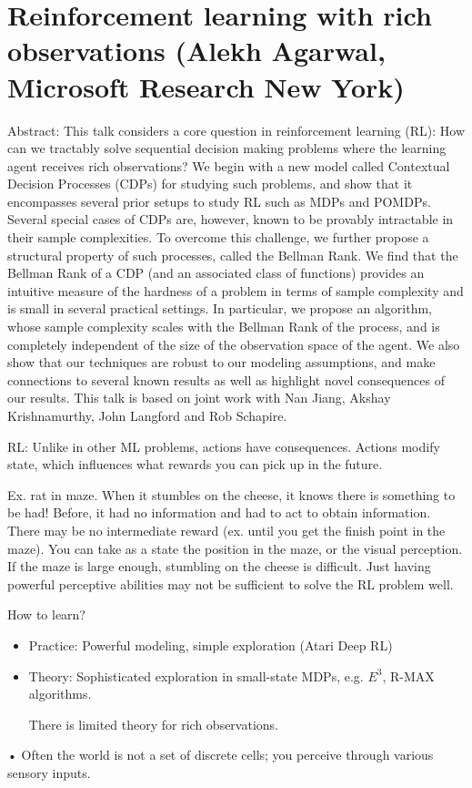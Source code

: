 \section{Reinforcement learning with rich observations (Alekh Agarwal, Microsoft Research New York)}

Abstract: This talk considers a core question in reinforcement learning (RL): How can we tractably solve sequential decision making problems where the learning agent receives rich observations? We begin with a new model called Contextual Decision Processes (CDPs) for studying such problems, and show that it encompasses several prior setups to study RL such as MDPs and POMDPs. Several special cases of CDPs are, however, known to be provably intractable in their sample complexities. To overcome this challenge, we further propose a structural property of such processes, called the Bellman Rank. We find that the Bellman Rank of a CDP (and an associated class of functions) provides an intuitive measure of the hardness of a problem in terms of sample complexity and is small in several practical settings. In particular, we propose an algorithm, whose sample complexity scales with the Bellman Rank of the process, and is completely independent of the size of the observation space of the agent. We also show that our techniques are robust to our modeling assumptions, and make connections to several known results as well as highlight novel consequences of our results. This talk is based on joint work with Nan Jiang, Akshay Krishnamurthy, John Langford and Rob Schapire.

RL: Unlike in other ML problems, actions have consequences. Actions modify state, which influences what rewards you can pick up in the future.

Ex. rat in maze. When it stumbles on the cheese, it knows there is something to be had! Before, it had no information and had to act to obtain information. There may be no intermediate reward (ex. until you get the finish point in the maze). You can take as a state the position in the maze, or the visual perception. If the maze is large enough, stumbling on the cheese is difficult. Just having powerful perceptive abilities may not be sufficient to solve the RL problem well.

How to learn?
\begin{itemize}
\item
Practice: 
Powerful modeling, simple exploration (Atari Deep RL)
\item
Theory:
Sophisticated exploration in small-state MDPs, e.g. $E^3$, R-MAX algorithms.

There is limited theory for rich observations.
\end{itemize}•
Often the world is not a set of discrete cells; you perceive through various sensory inputs.

